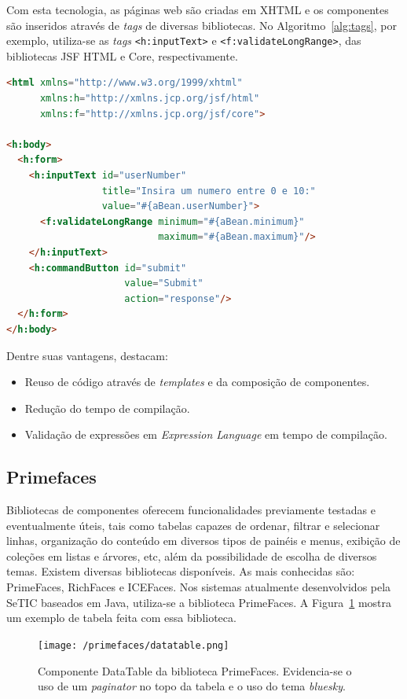 \documentclass[
  10.5pt,				  %
	openright,			%
	twoside,			  %
  a5paper,
  chapter=TITLE,	%
	section=TITLE,	%
  hyphens,        %
	english,        %
	brazil          %
]{abntex2}
\begin{document}
Com esta tecnologia, as páginas web são criadas em XHTML e os componentes são inseridos através de \emph{tags} de diversas bibliotecas. No Algoritmo~\ref{alg:tags}, por exemplo, utiliza-se as \emph{tags} \texttt{<h:inputText>} e \texttt{<f:validateLongRange>}, das bibliotecas  JSF HTML e Core, respectivamente.

\begin{lstlisting}[language=html, caption={Utilização de \emph{tags} em um arquivo XHTML.}, label={alg:tags}]
<html xmlns="http://www.w3.org/1999/xhtml"
      xmlns:h="http://xmlns.jcp.org/jsf/html"
      xmlns:f="http://xmlns.jcp.org/jsf/core">

<h:body>
  <h:form>
    <h:inputText id="userNumber"
                 title="Insira um numero entre 0 e 10:"
                 value="#{aBean.userNumber}">
      <f:validateLongRange minimum="#{aBean.minimum}"
                           maximum="#{aBean.maximum}"/>
    </h:inputText>
    <h:commandButton id="submit"
                     value="Submit"
                     action="response"/>
  </h:form>
</h:body>
\end{lstlisting}


Dentre suas vantagens, \cite{javaee7} destacam:
\begin{itemize}
  \item Reuso de código através de \emph{templates} e da composição de componentes.
  \item Redução do tempo de compilação.
  \item Validação de expressões em \emph{Expression Language} em tempo de compilação.
\end{itemize}


\subsection{Primefaces}
Bibliotecas de componentes oferecem funcionalidades previamente  testadas e eventualmente úteis, tais como tabelas capazes de ordenar, filtrar e selecionar linhas, organização do conteúdo em diversos tipos de painéis e menus, exibição de coleções em listas e árvores, etc, além da possibilidade de escolha de diversos temas. Existem diversas bibliotecas disponíveis. As mais conhecidas são: PrimeFaces, RichFaces e ICEFaces. Nos sistemas atualmente desenvolvidos pela SeTIC baseados em Java, utiliza-se a biblioteca PrimeFaces. A Figura~\ref{fig:primefaces_datatable} mostra um exemplo de tabela feita com essa biblioteca.

\begin{figure}[!ht]
  \caption{\label{fig:primefaces_datatable}Componente DataTable da biblioteca PrimeFaces. Evidencia-se o uso de um \emph{paginator} no topo da tabela e o uso do tema \emph{bluesky}.}
  \begin{center}
    \texttt{[image: /primefaces/datatable.png]}
  \end{center}
\end{figure}
\end{document}
